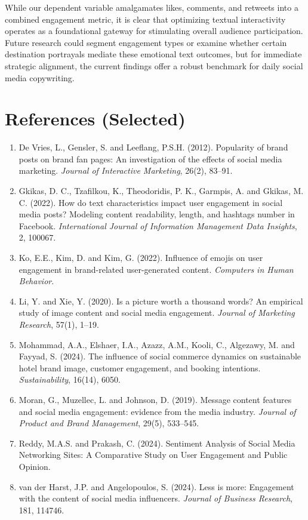 \documentclass[12pt,a4paper,fontset=none]{ctexart}
\begin{document}
While our dependent variable amalgamates likes, comments, and retweets into a combined engagement metric, it is clear that optimizing textual interactivity operates as a foundational gateway for stimulating overall audience participation. Future research could segment engagement types or examine whether certain destination portrayals mediate these emotional text outcomes, but for immediate strategic alignment, the current findings offer a robust benchmark for daily social media copywriting.

\section{References (Selected)}
\begin{enumerate}
    \item De Vries, L., Gensler, S. and Leeflang, P.S.H. (2012). Popularity of brand posts on brand fan pages: An investigation of the effects of social media marketing. \textit{Journal of Interactive Marketing}, 26(2), 83--91.
    \item Gkikas, D. C., Tzafilkou, K., Theodoridis, P. K., Garmpis, A. and Gkikas, M. C. (2022). How do text characteristics impact user engagement in social media posts? Modeling content readability, length, and hashtags number in Facebook. \textit{International Journal of Information Management Data Insights}, 2, 100067.
    \item Ko, E.E., Kim, D. and Kim, G. (2022). Influence of emojis on user engagement in brand-related user-generated content. \textit{Computers in Human Behavior}.
    \item Li, Y. and Xie, Y. (2020). Is a picture worth a thousand words? An empirical study of image content and social media engagement. \textit{Journal of Marketing Research}, 57(1), 1--19.
    \item Mohammad, A.A., Elshaer, I.A., Azazz, A.M., Kooli, C., Algezawy, M. and Fayyad, S. (2024). The influence of social commerce dynamics on sustainable hotel brand image, customer engagement, and booking intentions. \textit{Sustainability}, 16(14), 6050.
    \item Moran, G., Muzellec, L. and Johnson, D. (2019). Message content features and social media engagement: evidence from the media industry. \textit{Journal of Product and Brand Management}, 29(5), 533--545.
    \item Reddy, M.A.S. and Prakash, C. (2024). Sentiment Analysis of Social Media Networking Sites: A Comparative Study on User Engagement and Public Opinion.
    \item van der Harst, J.P. and Angelopoulos, S. (2024). Less is more: Engagement with the content of social media influencers. \textit{Journal of Business Research}, 181, 114746.
\end{enumerate}
\end{document}
